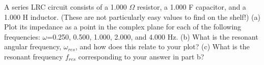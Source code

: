 A series LRC circuit consists of a 1.000 $\Omega$ resistor, a
        1.000 F capacitor, and a 1.000 H inductor. (These are
        not particularly easy values to find on the shelf!)\hwendpart
        (a) Plot its impedance as a point in the complex plane for each of
        the following frequencies: $\omega$=0.250, 0.500, 1.000, 2.000, and 4.000 Hz.\hwendpart
        (b) What is the resonant angular frequency, $\omega_{res}$, 
        and how does this relate to your plot?\answercheck\hwendpart
        (c) What is the resonant frequency $f_{res}$ corresponding to your answer in part b?\answercheck
